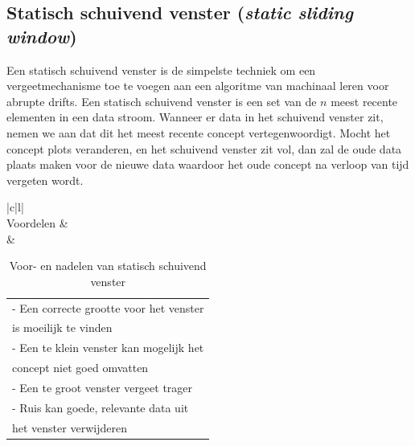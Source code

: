 \subsection{Statisch schuivend venster (\textit{static sliding window})}
Een statisch schuivend venster is de simpelste techniek om een vergeetmechanisme toe te voegen aan een algoritme van machinaal leren voor abrupte drifts. Een statisch schuivend venster is een set van de $n$ meest recente elementen in een data stroom. Wanneer er data in het schuivend venster zit, nemen we aan dat dit het meest recente concept vertegenwoordigt. Mocht het concept plots veranderen, en het schuivend venster zit vol, dan zal de oude data plaats maken voor de nieuwe data waardoor het oude concept na verloop van tijd vergeten wordt.
\setcounter{table}{0}
\begin{table}[h]
\begin{tabular}{|c|l|}
\hline
{} \\ \hline
Voordelen &  \\ \hline
{} & \begin{tabular}[c]{@{}l@{}} - Een correcte grootte voor het venster \\  \phantom{-} is moeilijk te vinden\\ - Een te klein venster kan mogelijk het \\ \phantom{-} concept niet goed omvatten\\ - Een te groot venster vergeet trager\\ - Ruis kan goede, relevante data uit \\ \phantom{-} het venster verwijderen\end{tabular} \\ \hline
\end{tabular}
\caption{Voor- en nadelen van statisch schuivend venster}
\label{tab:voor- en nadelen van fixed sliding window}
\end{table}
